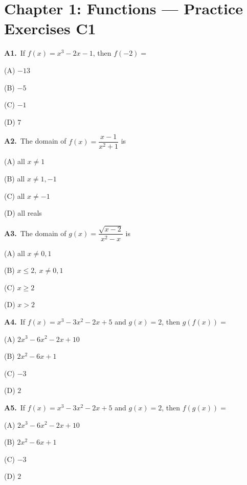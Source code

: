 \documentclass[11pt]{article}
\begin{document}
\section*{Chapter 1: Functions --- Practice Exercises C1}

\bigskip\noindent\textbf{A1.}\ If $f(x)=x^3-2x-1$, then $f(-2)=$
\begin{list}{}{\setlength{\leftmargin}{3em}\setlength{\labelwidth}{2.5em}\setlength{\itemsep}{0pt}\setlength{\topsep}{2pt}}
\item[(A)] $-13$
\item[(B)] $-5$
\item[(C)] $-1$
\item[(D)] $7$
\end{list}

\bigskip\noindent\textbf{A2.}\ The domain of $f(x)=\dfrac{x-1}{x^2+1}$ is
\begin{list}{}{\setlength{\leftmargin}{3em}\setlength{\labelwidth}{2.5em}\setlength{\itemsep}{0pt}\setlength{\topsep}{2pt}}
\item[(A)] all $x\ne1$
\item[(B)] all $x\ne1,-1$
\item[(C)] all $x\ne-1$
\item[(D)] all reals
\end{list}

\bigskip\noindent\textbf{A3.}\ The domain of $g(x)=\dfrac{\sqrt{x-2}}{x^2-x}$ is
\begin{list}{}{\setlength{\leftmargin}{3em}\setlength{\labelwidth}{2.5em}\setlength{\itemsep}{0pt}\setlength{\topsep}{2pt}}
\item[(A)] all $x\ne0,1$
\item[(B)] $x\le2,\ x\ne0,1$
\item[(C)] $x\ge2$
\item[(D)] $x>2$
\end{list}

\bigskip\noindent\textbf{A4.}\ If $f(x)=x^3-3x^2-2x+5$ and $g(x)=2$, then $g(f(x))=$
\begin{list}{}{\setlength{\leftmargin}{3em}\setlength{\labelwidth}{2.5em}\setlength{\itemsep}{0pt}\setlength{\topsep}{2pt}}
\item[(A)] $2x^3-6x^2-2x+10$
\item[(B)] $2x^2-6x+1$
\item[(C)] $-3$
\item[(D)] $2$
\end{list}

\bigskip\noindent\textbf{A5.}\ If $f(x)=x^3-3x^2-2x+5$ and $g(x)=2$, then $f(g(x))=$
\begin{list}{}{\setlength{\leftmargin}{3em}\setlength{\labelwidth}{2.5em}\setlength{\itemsep}{0pt}\setlength{\topsep}{2pt}}
\item[(A)] $2x^3-6x^2-2x+10$
\item[(B)] $2x^2-6x+1$
\item[(C)] $-3$
\item[(D)] $2$
\end{list}
\end{document}
